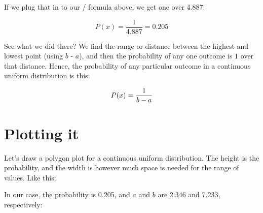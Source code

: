 \documentclass[../../../main.tex]{subfiles}
\begin{document}
If we plug that in to our \PDFtext/ formula above, we get one over 4.887:

\begin{equation*}
  P(x) = \frac{1}{4.887} = 0.205
\end{equation*} 

\noindent
See what we did there? We find the range or distance between the highest and lowest point (using $b$ - $a$), and then the probability of any one outcome is $1$ over that distance. Hence, the probability of any particular outcome in a continuous uniform distribution is this:

\begin{equation*}
  \Probability{\RandVarVal/} = \frac{1}{b - a}
\end{equation*} 


\section{Plotting it}

Let's draw a polygon plot for a continuous uniform distribution. The height is the probability, and the width is however much space is needed for the range of values. Like this:

\begin{center}
\end{center}

\noindent
In our case, the probability is 0.205, and $a$ and $b$ are 2.346 and 7.233, respectively:
\end{document}
